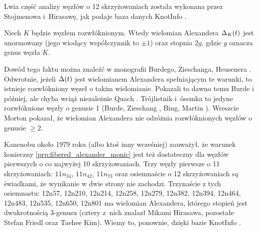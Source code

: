 Lwia część analizy węzłów o 12 skrzyżowaniach została wykonana przez Stojmenowa i~Hirasawę, jak podaje baza danych KnotInfo \cite{knotinfo2024}.
%
%

\begin{proposition}
%
\label{prp:fibered_alexander_monic}%
    Niech $K$ będzie węzłem rozwłóknionym.
    Wtedy wielomian Alexandera $\Delta_K(t)$ jest unormowany (jego wiodący współczynnik to $\pm 1$) oraz stopnia $2g$, gdzie $g$ oznacza genus węzła $K$.
\end{proposition}

Dowód tego faktu można znaleźć w monografii Burdego, Zieschanga, Heusenera \cite[s. 130]{burde2014}.
Odwrotnie, jeżeli $\Delta(t)$ jest wielomianem Alexandera spełniającym te warunki, to istnieje rozwłókniony węzeł o takim wielomianie.
Pokazali to dawno temu Burde \cite{burde1966} i później, ale chyba wciąż niezależnie Quach \cite{quach1979}.
Trójlistnik i~ósemka to jedyne rozwłóknione węzły o genusie 1 (Burde, Zieschang \cite{burde1967}, Bing, Martin \cite{bing1971}).
Wreszcie Morton \cite{morton1983} pokazał, że wielomian Alexandera nie odróżnia rozwłóknionych węzłów o genusie $\ge 2$.


Kanenobu około 1979 roku (albo ktoś inny wcześniej) zauważył, że warunek konieczny \ref{prp:fibered_alexander_monic} jest też dostateczny dla węzłów pierwszych o co najwyżej 10 skrzyżowaniach.
Trzy węzły pierwsze o 11 skrzyżowaniach: $11n_{34}$, $11n_{42}$, $11n_{73}$ oraz osiemnaście o 12 skrzyżowaniach są świadkami, że wynikanie w dwie strony nie zachodzi.
Trzynaście z tych osiemnastu: 12n57, 12n210, 12n214, 12n258, 12n279, 12n382, 12n394, 12n464, 12n483, 12n535, 12n650, 12n801 ma wielomian Alexandera, którego stopień jest dwukrotnością 3-genusu (cztery z~nich znalazł Mikami Hirasawa, pozostałe Stefan Friedl oraz Taehee Kim).
%
%
%
Wiemy to, ponownie, dzięki bazie KnotInfo \cite{knotinfo2024}.

